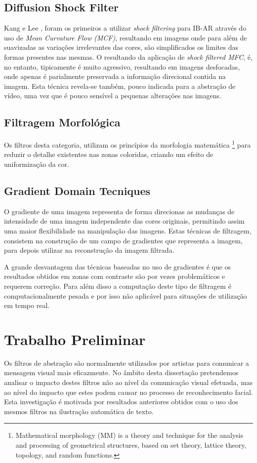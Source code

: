 \subsection{Diffusion Shock Filter}
Kang e Lee \cite{Kang2008}, foram os primeiros a utilizar \textit{shock filtering} para IB-AR através do uso de \textit{Mean Curvature Flow (MCF)}, resultando em imagens onde para além de suavizadas as variações irrelevantes das cores, são simplificados os limites das formas presentes nas mesmas. O resultando da aplicação de \textit{shock filtered MFC}, é, no entanto, tipicamente é muito agressivo, resultando em imagens desfocadas, onde apenas é parialmente preservada a  informação direcional contida na imagem. Esta técnica revela-se também, pouco indicada para a abstração de vídeo, uma vez que é pouco sensível a pequenas alterações nas imagens.

\subsection{Filtragem Morfológica}
Os filtros desta categoria, utilizam os princípios da morfologia matemática \footnote{Mathematical morphology (MM) is a theory and technique for the analysis and processing of geometrical structures, based on set theory, lattice theory, topology, and random functions.} para reduzir o detalhe existentes nas zonas coloridas, criando um efeito de uniformização da cor.

\subsection{Gradient Domain Tecniques}
O gradiente de uma imagem representa de forma direcionas as mudanças de intensidade de uma imagem independente das cores originais, permitindo assim uma maior flexibilidade na manipulação das imagens. Estas técnicas de filtragem, consistem na construção de um campo de gradientes que representa a imagem, para depois utilizar na reconstrução da imagem filtrada.

A grande desvantagem das técnicas baseadas no uso de gradientes é que os resultados obtidos em zonas com contraste são por vezes problemáticos e requerem correção. Para além disso a computação deste tipo de filtragem é computacionalmente pesada e por isso não aplicável para situações de utilização em tempo real.

\section{Trabalho Preliminar}
Os filtros de abstração são normalmente utilizados por artistas para comunicar a mensagem visual mais eficazmente.  No âmbito desta dissertação pretendemos analisar o impacto destes filtros não ao nível da comunicação visual efetuada, mas ao nível do impacto que estes podem causar no processo de reconhecimento facial. Esta investigação é motivada por resultados anteriores obtidos com o uso dos mesmos filtros na ilustração automática de texto.

